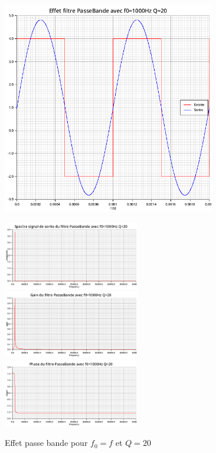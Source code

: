 \documentclass{article}
\begin{document}
\begin{figure}[H]
  \begin{minipage}{0.6\textwidth}
      \centering
      \includegraphics[width=25em]{images/creneau/bande/q=20/1/signals.png}
  \end{minipage}
  \begin{minipage}{0.3\textwidth}
      \centering
      \includegraphics[width=16em]{images/creneau/bande/q=20/1/fft_out.png}
      \vfill
      \includegraphics[width=16em]{images/creneau/bande/q=20/1/gain.png}
      \vfill
      \includegraphics[width=16em]{images/creneau/bande/q=20/1/phase.png}
  \end{minipage}
  \caption{Effet passe bande pour $f_0=f$ et $Q=20$}
\end{figure}
\end{document}
